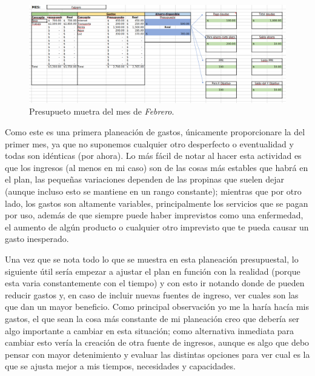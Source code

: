 \documentclass[11pt]{article}
\title{\titulo}
\author{ Universidad Virtual del Estado de Guanajuato \textbf{UVEG} \\ 
\materia \\ Benjamín Rivera \\ 19015478 }
\date{\textit{Fecha de entrega:} \today}
\begin{document}
	\maketitle
	
	\begin{figure}[htp]
		\centering
		\includegraphics[width=1.1\textwidth]{assets/R5_U3.png}
		\caption{Presupueto muetra del mes de \textit{Febrero}.}
		\label{Capturas}
	\end{figure}
	
	\par Como este es una primera planeación de gastos, únicamente proporcionare la del primer mes, ya que no suponemos cualquier otro desperfecto o eventualidad y todas son idénticas (por ahora). Lo más fácil de notar al hacer esta actividad es que los ingresos (al menos en mi caso) son de las cosas más estables que habrá en el plan, las pequeñas variaciones dependen de las propinas que suelen dejar (aunque incluso esto se mantiene en un rango constante); mientras que por otro lado, los gastos son altamente variables, principalmente los servicios que se pagan por uso, además de que siempre puede haber imprevistos como una enfermedad, el aumento de algún producto o cualquier otro imprevisto que te pueda causar un gasto inesperado.
	
	\par Una vez que se nota todo lo que se muestra en esta planeación presupuestal, lo siguiente útil sería empezar a ajustar el plan en función con la realidad (porque esta varia constantemente con el tiempo) y con esto ir notando donde de pueden reducir gastos y, en caso de incluir nuevas fuentes de ingreso, ver cuales son las que dan un mayor beneficio. Como principal observación yo me la haría hacía mis gastos, el que sean la cosa más constante de mi planeación creo que debería ser algo importante a cambiar en esta situación; como alternativa inmediata para cambiar esto vería la creación de otra fuente de ingresos, aunque es algo que debo pensar con mayor detenimiento y evaluar las distintas opciones para ver cual es la que se ajusta mejor a mis tiempos, necesidades y capacidades.
	
\end{document}
